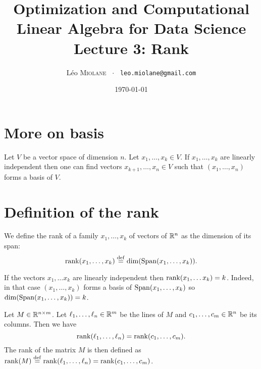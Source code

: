 \documentclass[11pt,nocut]{article}
\title{\vspace{-2.0cm}%
	Optimization and Computational Linear Algebra for Data Science\\
	Lecture 3: Rank}
\author{Léo \textsc{Miolane} \ $\cdot$ \ \texttt{leo.miolane@gmail.com}}
\date{\today}
\begin{document}
\maketitle


\section{More on basis}

\begin{proposition}\label{prop:complete}
	Let $V$ be a vector space of dimension $n$.
	Let $x_1, \dots, x_k \in V$. 
	If $x_1, \dots, x_k$  are linearly independent then one can find vectors $x_{k+1}, \dots, x_{n} \in V$ such that $(x_1, \dots, x_n)$ forms a basis of $V$.
\end{proposition}


\section{Definition of the rank}

\begin{definition}
	We define the rank of a family $x_1, \dots, x_k$ of vectors of $\mathbb{R}^n$ as the dimension of its span:
	$$
	{{\rm rank}}(x_1, \dots, x_k) \overset{\rm def}{=} {{\rm dim}} ({{\rm Span}}(x_1, \dots, x_k)).
	$$
\end{definition}

If the vectors $x_1, \dots x_k$ are linearly independent then ${{\rm rank}}(x_1, \dots x_k) = k$. Indeed, in that case $(x_1, \dots, x_k)$ forms a basis of ${{\rm Span}}(x_1, \dots, x_k)$ so ${{\rm dim}}({{\rm Span}}(x_1, \dots, x_k)) = k$.


\begin{definition}\label{def:rank}
	Let $M \in \mathbb{R}^{n \times m}$. Let $\ell_1, \dots, \ell_n \in \mathbb{R}^m$ be the lines of $M$ and $c_1, \dots, c_m \in \mathbb{R}^n$ be its columns.
	Then we have
	\begin{equation}\label{eq:rank}
	{{\rm rank}}(\ell_1, \dots, \ell_n) = {{\rm rank}}(c_1, \dots, c_m).
	\end{equation}
	The rank of the matrix $M$ is then defined as ${{\rm rank}}(M) \overset{\rm def}{=}{{\rm rank}}(\ell_1, \dots, \ell_n) = {{\rm rank}}(c_1, \dots, c_m)$.
\end{definition}
\end{document}
